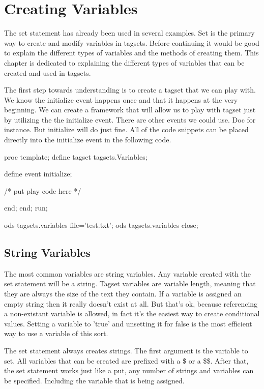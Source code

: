 \chapter{Creating Variables}
\index{\$}
\index{\$\$}
The set statement has already been used in several examples. 
Set is the primary way to create and modify variables in
tagsets.
Before continuing it would be good to
explain the different types of variables and the methods 
of creating them.  This chapter is dedicated to explaining
the different types of variables that can be created and 
used in tagsets.

The first step towards understanding is to create a tagset that
we can play with.  We know the initialize event happens once and
that it happens at the very beginning.  We can create a framework
that will allow us to play with tagset just by utilizing the the
initialize event.  There are other events we could use.  Doc for
instance.  But initialize will do just fine.  All of the code snippets
can be placed directly into the initialize event in the following code.

\begin{sfvcode}
proc template;
     define tagset tagsets.Variables;

         define event initialize;

             /* put play code here */

         end;
     end;
run;

ods tagsets.variables file='test.txt';
ods tagsets.variables close;

\end{sfvcode}


\section{String Variables}
The most common variables are string variables.  Any variable
created with the set statement will be a string.  Tagset variables
are variable length, meaning that they are always the size of the
text they contain.  If a variable is assigned an empty string then
it really doesn't exist at all.  But that's ok, because referencing
a non-existant variable is allowed, in fact it's the easiest way
to create conditional values.  Setting a variable to 'true' and unsetting
it for false is the most efficient way to use a variable of this sort.

The set statement always creates strings.  The first argument is
the variable to set.  
All variables that can be created are
prefixed with a \$ or a \$\$.
After that, the set statement works just like a put,  any number
of strings and variables can be specified.  Including the variable
that is being assigned.

